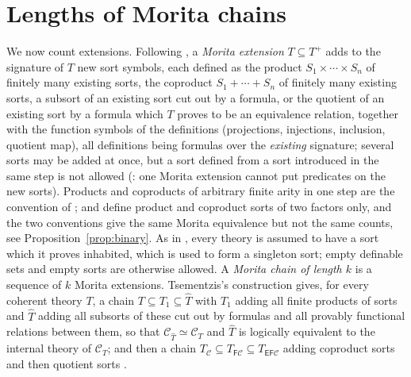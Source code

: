 \documentclass[11pt]{amsart}
\theoremstyle{definition}
\newcommand{\FF}{\mathsf F}
\newcommand{\EE}{\mathsf E}
\newcommand{\cC}{\mathcal C}
\begin{document}
\section{Lengths of Morita chains}\label{sec:length}

We now count extensions. Following \cite[\S2]{Tsem17}, a \emph{Morita
extension} $T\subseteq T^+$ adds to the signature of $T$ new sort
symbols, each defined as the product $S_1\times\cdots\times S_n$ of
finitely many existing sorts, the coproduct $S_1+\cdots+S_n$ of finitely
many existing sorts, a subsort of an existing sort cut out by a formula,
or the quotient of an existing sort by a formula which $T$ proves to be
an equivalence relation, together with the function symbols of the
definitions (projections, injections, inclusion, quotient map), all
definitions being formulas over the \emph{existing} signature; several
sorts may be added at once, but a sort defined from a sort introduced in
the same step is not allowed (\cite[fn.~8]{BH16}: one Morita extension
cannot put predicates on the new sorts). Products and coproducts of
arbitrary finite arity in one step are the convention of
\cite[\S2]{Tsem17}; \cite{BH16} and \cite{Meadows24} define product and
coproduct sorts of two factors only, and the two conventions give the
same Morita equivalence but not the same counts, see
Proposition~\ref{prop:binary}. As in \cite[\S2]{Tsem17}, every theory is
assumed to have a sort which it proves inhabited, which is used to form
a singleton sort; empty definable sets and empty sorts are otherwise
allowed. A \emph{Morita chain of length $k$} is a sequence of $k$ Morita
extensions. Tsementzis's construction \cite[\S4]{Tsem17} gives, for
every coherent theory $T$, a chain $T\subseteq T_1\subseteq\widehat T$
with $T_1$ adding all finite products of sorts and $\widehat T$ adding
all subsorts of these cut out by formulas and all provably functional
relations between them, so that $\cC_{\widehat T}\simeq\cC_T$ and
$\widehat T$ is logically equivalent to the internal theory of $\cC_T$;
and then a chain $T_{\cC}\subseteq T_{\FF\cC}\subseteq T_{\EE\FF\cC}$
adding coproduct sorts and then quotient sorts
\cite[Prop.~4.2]{Tsem17}.
\end{document}
